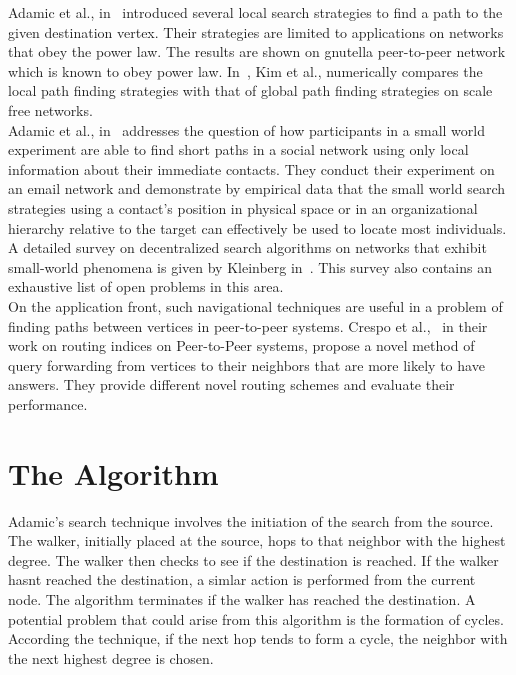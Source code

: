 \documentclass[a4paper,12pt]{article}
\begin{document}
Adamic et al., in~\cite{adamic01} introduced several local search strategies to find a path to the given destination vertex. Their strategies are limited to applications on networks that obey the power law. The results are shown on gnutella peer-to-peer network which is known to obey power law. In~\cite{kim02}, Kim et al., numerically compares the local path finding strategies with that of global path finding strategies on scale free networks.\\ 

Adamic et al., in~\cite{adamic05} addresses the question of how participants in a small world experiment are able to find short paths in a social network using only local information about their immediate contacts. They conduct their experiment on an email network and demonstrate by empirical data that the small world search strategies using a contact's position in physical space or in an organizational hierarchy relative to the target can effectively be used to locate most individuals.\\

A detailed survey on decentralized search algorithms on networks that exhibit small-world phenomena is given by Kleinberg in~\cite{kleinberg06}. This survey also contains an exhaustive list of open problems in this area.\\

On the application front, such navigational techniques are useful in a problem of finding paths between vertices in peer-to-peer systems.  Crespo et al.,~\cite{crespo02} in their work on routing indices on Peer-to-Peer systems, propose a novel method of query forwarding from vertices to their neighbors that are more likely to have answers. They provide different novel routing schemes and evaluate their performance.

\newpage
\section{The Algorithm}
\label{sec:idea}
Adamic's search technique involves the initiation of the search from the source. The walker, initially placed at the source, hops to that neighbor with the highest degree. The walker then checks to see if the destination is reached. If the walker hasnt reached the destination, a simlar action is performed from the current node. The algorithm terminates if the walker has reached the destination. A potential problem that could arise from this algorithm is the formation of cycles. According the technique, if the next hop tends to form a cycle, the neighbor with the next highest degree is chosen.
\end{document}
